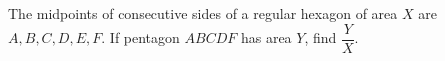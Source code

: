 The midpoints of consecutive sides of a regular hexagon of area $X$ are $A,B,C,D,E,F$. If pentagon $ABCDF$ has area $Y$, find $\dfrac {Y}{X}$.
